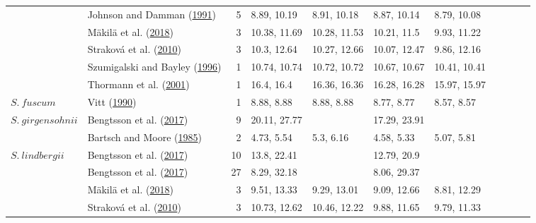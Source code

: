 \documentclass[
  12pt,
]{article}
\begin{document}
\begin{table}[H]
{\begin{tabular}[t]{llrllllllll}
 & Johnson and Damman (\protect\hyperlink{ref-Johnson.1991}{1991}) & 5 & 8.89, 10.19 & 8.91, 10.18 & 8.87, 10.14 & 8.79, 10.08 &  &  &  & \\

 & Mäkilä et al. (\protect\hyperlink{ref-Makila.2018}{2018}) & 3 & 10.38, 11.69 & 10.28, 11.53 & 10.21, 11.5 & 9.93, 11.22 &  &  &  & \\

 & Straková et al. (\protect\hyperlink{ref-Strakova.2010}{2010}) & 3 & 10.3, 12.64 & 10.27, 12.66 & 10.07, 12.47 & 9.86, 12.16 &  &  &  & \\

 & Szumigalski and Bayley (\protect\hyperlink{ref-Szumigalski.1996}{1996}) & 1 & 10.74, 10.74 & 10.72, 10.72 & 10.67, 10.67 & 10.41, 10.41 &  &  &  & \\

 & Thormann et al. (\protect\hyperlink{ref-Thormann.2001}{2001}) & 1 & 16.4, 16.4 & 16.36, 16.36 & 16.28, 16.28 & 15.97, 15.97 &  &  &  & \\

\multirow[t]{-10}{*}{\raggedright\arraybackslash $S.~fuscum$} & Vitt (\protect\hyperlink{ref-Vitt.1990}{1990}) & 1 & 8.88, 8.88 & 8.88, 8.88 & 8.77, 8.77 & 8.57, 8.57 &  &  &  & \\
\cmidrule{1-11}
$S.~girgensohnii$ & Bengtsson et al. (\protect\hyperlink{ref-Bengtsson.2017}{2017}) & 9 & 20.11, 27.77 &  & 17.29, 23.91 &  &  &  &  & \\
\cmidrule{1-11}
 & Bartsch and Moore (\protect\hyperlink{ref-Bartsch.1985}{1985}) & 2 & 4.73, 5.54 & 5.3, 6.16 & 4.58, 5.33 & 5.07, 5.81 &  &  &  & \\

\multirow[t]{-2}{*}{\raggedright\arraybackslash $S.~lindbergii$} & Bengtsson et al. (\protect\hyperlink{ref-Bengtsson.2017}{2017}) & 10 & 13.8, 22.41 &  & 12.79, 20.9 &  &  &  &  & \\
\cmidrule{1-11}
 & Bengtsson et al. (\protect\hyperlink{ref-Bengtsson.2017}{2017}) & 27 & 8.29, 32.18 &  & 8.06, 29.37 &  &  &  &  & \\

 & Mäkilä et al. (\protect\hyperlink{ref-Makila.2018}{2018}) & 3 & 9.51, 13.33 & 9.29, 13.01 & 9.09, 12.66 & 8.81, 12.29 &  &  &  & \\

 & Straková et al. (\protect\hyperlink{ref-Strakova.2010}{2010}) & 3 & 10.73, 12.62 & 10.46, 12.22 & 9.88, 11.65 & 9.79, 11.33 &  &  &  & \\


\end{tabular}}
\end{table}
\end{document}

